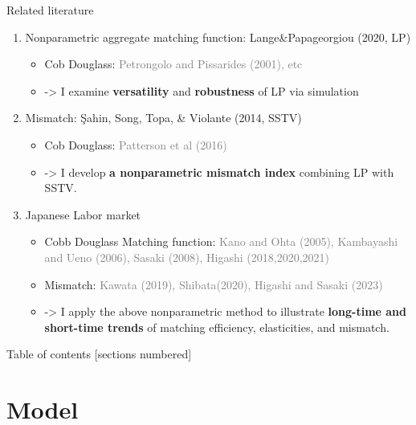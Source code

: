 \documentclass[aspectratio=169]{beamer}
\begin{document}
\begin{frame}{Related literature}
    \begin{enumerate}
        \item Nonparametric aggregate matching function: Lange\&Papageorgiou (2020, LP)
        \begin{itemize}
            \item Cob Douglass: \textcolor{gray}{Petrongolo and Pissarides (2001), etc}
            \item -> I examine \textbf{versatility} and \textbf{robustness} of LP via simulation
        \end{itemize}
        \item Mismatch: Şahin, Song, Topa, \& Violante (2014, SSTV)
        \begin{itemize}
            \item Cob Douglass: \textcolor{gray}{Patterson et al (2016)}
            \item -> I develop \textbf{a nonparametric mismatch index} combining LP with SSTV.
        \end{itemize}
        \item Japanese Labor market
        \begin{itemize}
            \item Cobb Douglass Matching function: \textcolor{gray}{Kano and Ohta (2005), Kambayashi and Ueno (2006), Sasaki (2008), Higashi (2018,2020,2021)}
            \item Mismatch: \textcolor{gray}{Kawata (2019), Shibata(2020), Higashi and Sasaki (2023)}
            \item -> I apply the above nonparametric method to illustrate \textbf{long-time and short-time trends} of matching efficiency, elasticities, and mismatch.
        \end{itemize}
    \end{enumerate}
\end{frame}

\begin{frame}{Table of contents}
  [sections numbered]
  \tableofcontents%
\end{frame}



\section{Model}
\end{document}
